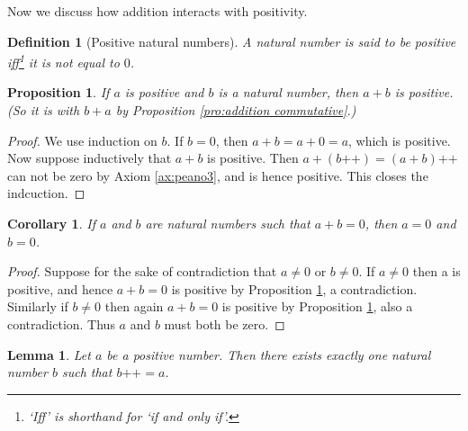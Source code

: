 \documentclass[a4paper,oneside]{book}
\newtheorem*{proof}{\textit{Proof.}}
\newtheorem{definition}{Definition}[section]
\newtheorem{corollary}{Corollary}[section]
\newtheorem{lemma}{Lemma}[section]
\newtheorem{proposition}{Proposition}[section]
\begin{document}
			Now we discuss how addition interacts with positivity.
			\begin{definition}[Positive natural numbers]
				A natural number is said to be positive iff\footnote{`Iff' is shorthand for `if and only if'.} it is not equal to $0$.
			\end{definition}
			\begin{proposition}
				\label{pro:a+b>0}
				If $a$ is positive and $b$ is a natural number, then $a+b$ is positive. (So it is with $b+a$ by Proposition \ref{pro:addition commutative}.)
			\end{proposition}
			\begin{proof}
				We use induction on $b$. If $b=0$, then $a+b=a+0=a$, which is positive. Now suppose inductively that $a+b$ is positive. Then $a+(b\texttt{++})=(a+b)\texttt{++}$ can not be zero by Axiom \ref{ax:peano3}, and is hence positive. This closes the indcuction.
			\end{proof}
			\begin{corollary}
				\label{coro:a+b=0}
				If $a$ and $b$ are natural numbers such that $a+b=0$, then $a=0$ and $b=0$.
			\end{corollary}
			\begin{proof}
				Suppose for the sake of contradiction that $a \neq 0$ or $b \neq 0$. If $a \neq 0$ then a is positive, and hence $a+b=0$ is positive by Proposition \ref{pro:a+b>0}, a contradiction. Similarly if $b \neq 0$ then again $a+b=0$ is positive by Proposition \ref{pro:a+b>0}, also a contradiction. Thus $a$ and $b$ must both be zero. 
			\end{proof}
			\begin{lemma}
				\label{lem:b++=a}
				Let $a$ be a positive number. Then there exists exactly one natural number $b$ such that $b\texttt{++}=a$.
			\end{lemma}
\end{document}
